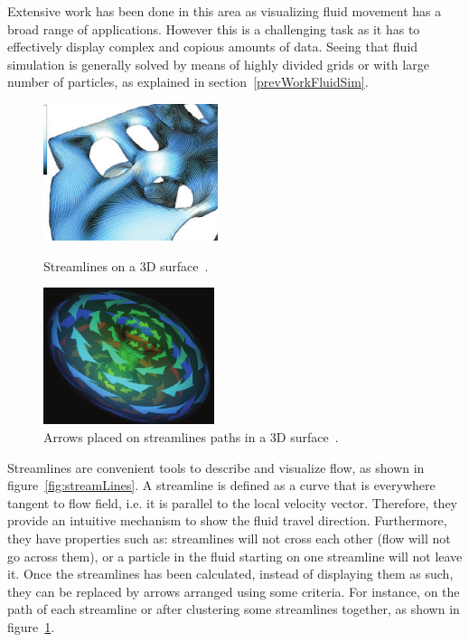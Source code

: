 
Extensive work has been done in this area as visualizing fluid movement has a broad range of applications.
However this is a challenging task as it has to effectively display complex and copious amounts of data.
Seeing that fluid simulation is generally solved by means of highly divided grids or with large number of particles, as explained in section~\ref{prevWorkFluidSim}.\\

\begin{figure}
	\centering
	\begin{minipage}[t]{.45\textwidth}
		\centering
		\includegraphics[width=.8\textwidth,height=4cm]{images/streamLinesSpencer}
		\caption{Streamlines on a 3D surface~\cite{Spencer2009}.}
		\label{fig:streamLines}
	\end{minipage}\hfill
	\begin{minipage}[t]{.45\textwidth}
		\centering
		\includegraphics[width=.8\textwidth,height=4cm]{images/streamArrows}
		\caption{Arrows placed on streamlines paths in a 3D surface~\cite{loffelmann1998}.}
		\label{fig:streamArrows}
	\end{minipage}
\end{figure}

Streamlines are convenient tools to describe and visualize flow, as shown in figure~\ref{fig:streamLines}.
A streamline is defined as a curve that is everywhere tangent to flow field, i.e. it is parallel to the local velocity vector.
Therefore, they provide an intuitive mechanism to show the fluid travel direction.
Furthermore, they have properties such as: streamlines will not cross each other (flow will not go across them), or a particle in the fluid starting on one streamline will not leave it.
Once the streamlines has been calculated, instead of displaying them as such, they can be replaced by arrows arranged using some criteria.
For instance, on the path of each streamline or after clustering some streamlines together, as shown in figure~\ref{fig:streamArrows}.\\

